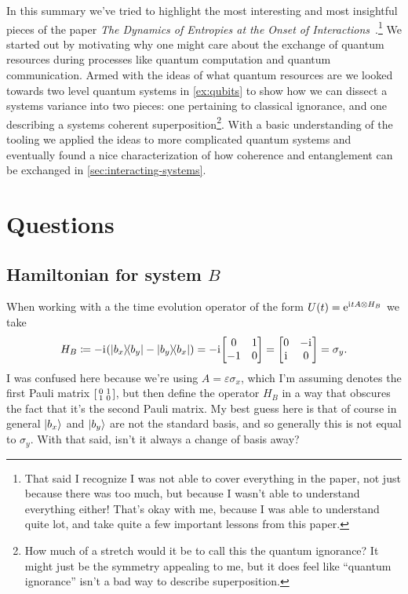 \documentclass[11pt,english]{article}
\theoremstyle{definition}
\newcommand{\iu}{\mathrm{i}\mkern1mu}
\newcommand{\e}{\mathrm{e}}
\begin{document}
In this summary we've tried to highlight the most interesting and most insightful pieces of the paper \emph{The Dynamics of Entropies at the Onset of Interactions}~\cite{dynamic-entropies}.\footnote{That said I recognize I was not able to cover everything in the paper, not just because there was too much, but because I wasn't able to understand everything either! That's okay with me, because I was able to understand quite lot, and take quite a few important lessons from this paper.} We started out by motivating why one might care about the exchange of quantum resources during processes like quantum computation and quantum communication. Armed with the ideas of what quantum resources are we looked towards two level quantum systems in \cref{ex:qubits} to show how we can dissect a systems variance into two pieces: one pertaining to classical ignorance, and one describing a systems coherent superposition\footnote{How much of a stretch would it be to call this the quantum ignorance? It might just be the symmetry appealing to me, but it does feel like ``quantum ignorance'' isn't a bad way to describe superposition.}. With a basic understanding of the tooling we applied the ideas to more complicated quantum systems and eventually found a nice characterization of how coherence and entanglement can be exchanged in \cref{sec:interacting-systems}.

\section{Questions}

\subsection{Hamiltonian for system $B$}
When working with a the time evolution operator of the form $U(t) = \e^{\iu tA\otimes H_B}$ we take
\begin{equation*}
	H_B \coloneqq -\iu\qty(\ketbra{b_x}{b_y} - \ketbra{b_y}{b_x}) = -\iu\mqty[0 & 1 \\ -1 & 0] = \mqty[0 & -\iu \\ \iu & 0] = \sigma_y.
\end{equation*}
I was confused here because we're using $A = \varepsilon\sigma_x$, which I'm assuming denotes the first Pauli matrix $\smqty[0 & 1 \\ 1 & 0]$, but then define the operator $H_B$ in a way that obscures the fact that it's the second Pauli matrix. My best guess here is that of course in general $\ket{b_x}$ and $\ket{b_y}$ are not the standard basis, and so generally this is not equal to $\sigma_y$. With that said, isn't it always a change of basis away?
\end{document}

